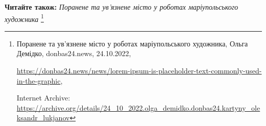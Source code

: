  
 
 
 
 

\textbf{Читайте також:} \emph{Поранене та ув'язнене місто у роботах маріупольського художника}%
\footnote{Поранене та ув'язнене місто у роботах маріупольського художника, Ольга Демідко, donbas24.news, 24.10.2022, \par%
\url{https://donbas24.news/news/lorem-ipsum-is-placeholder-text-commonly-used-in-the-graphic}, \par%
Internet Archive: \url{https://archive.org/details/24_10_2022.olga_demidko.donbas24.kartyny_oleksandr_lukjanov}%
}
